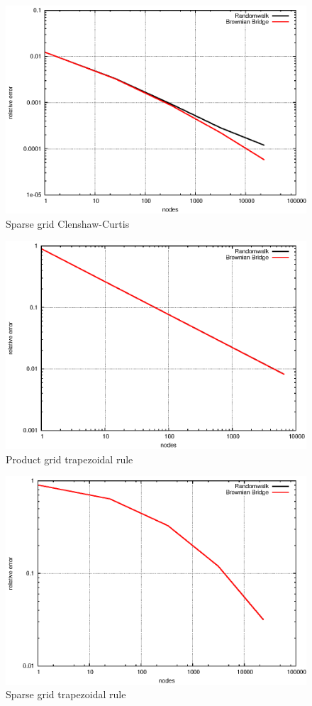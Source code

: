 \documentclass[]{article}
\begin{document}
\begin{figure}[!ht]
\centering
\includegraphics{task16_ccsparse}
\caption{Sparse grid Clenshaw-Curtis}
\label{fig:Task16b}
\end{figure}

\begin{figure}[!ht]
\centering
\includegraphics{task16_trapprod}
\caption{Product grid trapezoidal rule}
\label{fig:Task16c}
\end{figure}

\begin{figure}[!ht]
\centering
\includegraphics{task16_trapsparse}
\caption{Sparse grid trapezoidal rule}
\label{fig:Task16d}
\end{figure}
\end{document}
